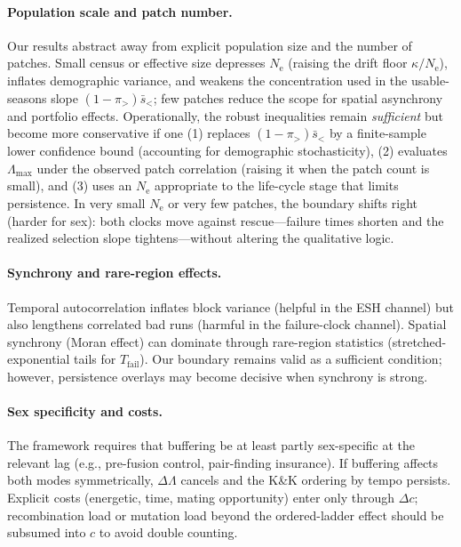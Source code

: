 \documentclass[11pt]{article}
\theoremstyle{upright}
\newcommand{\horizon}{\Lambda}
\newcommand{\Ne}{N_{\mathrm{e}}}
\newcommand{\Lmax}{\horizon^{(T)}_{\max}}
\renewcommand{\Lmax}{\Lambda_{\max}}
\begin{document}
\paragraph{Population scale and patch number.}
Our results abstract away from explicit population size and the number of patches.
Small census or effective size depresses $\Ne$ (raising the drift floor $\kappa/\Ne$),
inflates demographic variance, and weakens the concentration used in the usable-seasons slope
$(1-\pi_{>})\bar s_{<}$; few patches reduce the scope for spatial asynchrony and portfolio effects.
Operationally, the robust inequalities remain \emph{sufficient} but become more conservative if one
(1) replaces $(1-\pi_{>})\bar s_{<}$ by a finite-sample lower confidence bound (accounting for demographic
stochasticity), (2) evaluates $\Lmax$ under the observed patch correlation (raising it when the patch count is small),
and (3) uses an $\Ne$ appropriate to the life-cycle stage that limits persistence. In very small $\Ne$ or very few
patches, the boundary shifts right (harder for sex): both clocks move against rescue—failure times shorten and the
realized selection slope tightens—without altering the qualitative logic.

\paragraph{Synchrony and rare-region effects.}
Temporal autocorrelation inflates block variance (helpful in the ESH channel) but also lengthens correlated bad runs (harmful in the failure-clock channel). Spatial synchrony (Moran effect) can dominate through rare-region statistics (stretched-exponential tails for $T_{\mathrm{fail}}$). Our boundary remains valid as a sufficient condition; however, persistence overlays may become decisive when synchrony is strong.

\paragraph{Sex specificity and costs.}
The framework requires that buffering be at least partly sex-specific at the relevant lag (e.g., pre-fusion control, pair-finding insurance). If buffering affects both modes symmetrically, $\Delta\Lambda$ cancels and the K\&K ordering by tempo persists. Explicit costs (energetic, time, mating opportunity) enter only through $\Delta c$; recombination load or mutation load beyond the ordered-ladder effect should be subsumed into $c$ to avoid double counting.
\end{document}
